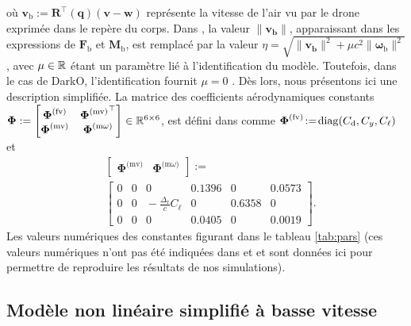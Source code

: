 où $\boldsymbol{v}_{\text{b}} := \boldsymbol{R}^\top(\boldsymbol{q}) (\boldsymbol{v}-\boldsymbol{w})$ représente la vitesse de l'air vu par le drone exprimée dans le repère du corps. Dans \cite{lustosaHal-03035938}, la valeur $\lVert \boldsymbol{v_{\text{b}}} \rVert$, apparaissant dans les expressions de  $\boldsymbol{F}_{\text{b}}$ et $\boldsymbol{M}_{\text{b}}$, est remplacé par la valeur $\eta = \sqrt{\lVert \boldsymbol{v_{\text{b}}} \rVert^{2} + \mu c^{2} \lVert \boldsymbol{\omega}_{\text{b}} \rVert^{2}}$, avec $\mu \in {\mathbb R}$ étant un paramètre lié à l'identification du modèle. Toutefois, dans le cas de DarkO, l'identification fournit $\mu = 0$ \cite{sansouStage}. Dès lors, nous présentons ici une description simplifiée. La matrice des coefficients aérodynamiques constants 
$\boldsymbol{\Phi}:= \begin{bmatrix} \boldsymbol{\Phi}^{\text{(fv)}} & {\boldsymbol{\Phi}^{\text{(mv)}}}^\top \\ \boldsymbol{\Phi}^{\text{(mv)}} & \boldsymbol{\Phi}^{\text{(m$\omega$)}} \end{bmatrix} \in {\mathbb R}^{6 \times 6}$, est défini dans \cite[eqs. (6)--(9)]{olszaneckibarthHal-02542982} comme $ \boldsymbol{\Phi}^{\text{(fv)}} \!:=\! \operatorname{diag}(C_{\text{d}},C_{y}, C_{\ell})$ et
\begin{align*}
&\left[ \begin{array}{c|c}
    \boldsymbol{\Phi}^{\text{(mv)}}  &  \boldsymbol{\Phi}^{\text{(m$\omega$)}} 
\end{array}\right] :=\\ 
&\left[ \begin{array}{ccc|ccc}
    0 & 0 & 0    &                                          0.1396 & 0 & 0.0573 \\
    0 & 0 & \!\!\!\!\! -\frac{\Delta_{\text{r}}}{c}C_{\ell} &    0 &  0.6358  & 0 \\
    0 & 0 & 0 &     0.0405 & 0 & 0.0019 
\end{array}\right].
\end{align*}
Les valeurs numériques des constantes figurant dans le tableau \ref{tab:pars} (ces valeurs numériques n'ont pas été indiquées dans \cite{lustosaHal-03035938} et \cite{olszaneckibarthHal-02542982} et sont données ici pour permettre de reproduire les résultats de nos simulations). 


\subsection{Modèle non linéaire simplifié à basse vitesse}
\label{sec:model_NL_simp}

